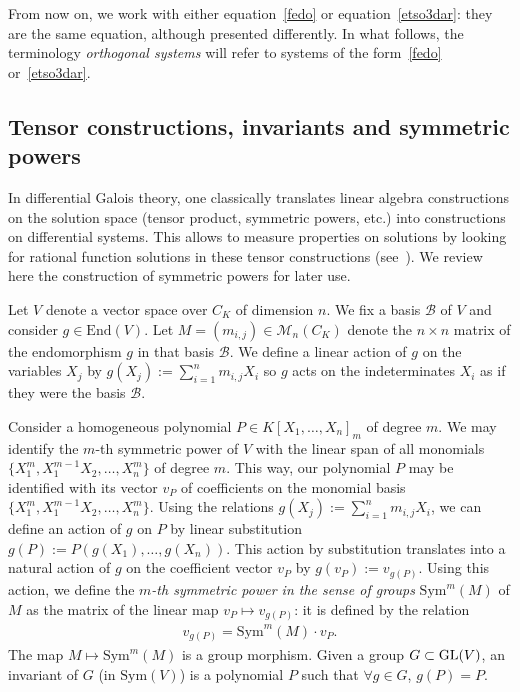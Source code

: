 \documentclass[10pt,a4paper]{amsart}
\numberwithin{equation}{section}
\def\Sym{\mathrm{Sym}}
\providecommand{\cal}{\mathcal}
\begin{document}
From now on, we work with either equation~\eqref{fedo} or equation~\eqref{etso3dar}: they are the same equation, although presented differently.
In what follows, the terminology \emph{orthogonal systems} will refer to systems of the form~\eqref{fedo} or~\eqref{etso3dar}.



\subsection{Tensor constructions, invariants and symmetric powers}\label{tensor-constructions}

In differential Galois theory, one classically translates linear algebra constructions on the solution space (tensor product, symmetric powers, etc.) into constructions on differential systems. This allows to measure properties on solutions by looking for rational function solutions in these tensor constructions (see~\cite[Chapters~3 and~4]{PS}). We review here the construction of symmetric powers for later use.

Let $V$ denote a vector space over $C_K$ of dimension $n$. We fix a basis $\cal{B}$ of $V$ and consider $g\in \mathrm{End}(V)$. Let
$M = (m_{i,j}) \in {\mathcal M}_{n}(C_K)$ denote the $n\times n$ matrix of the endomorphism $g$ in that basis $\cal{B}$.
We define a linear action of $g$
on the variables $X_{j}$ by $g(X_{j}):=\sum_{i=1}^n m_{i,j} X_{i}$ so $g$ acts on the indeterminates $X_i$ as if they were the basis $\cal{B}$.

Consider a homogeneous polynomial
$P\in K[X_{1},\ldots,X_{n}]_{m}$ of degree $m$.
We may identify the $m$-th symmetric power of $V$ with the linear span of all monomials
$\{X_{1}^{m}, X_{1}^{m-1}X_{2}, \ldots, X_{n}^{m}\}$ of degree $m$. This way, our polynomial $P$ may be identified with its vector $v_{P}$ of coefficients on the monomial basis $\{X_{1}^{m}, X_{1}^{m-1}X_{2}, \ldots,X_{n}^{m}\}$.
Using the relations $g(X_{j}):=\sum_{i=1}^n m_{i,j} X_{i}$, we can define an action of
$g$ on $P$ by linear substitution $g(P):=P(g(X_{1}),\ldots, g(X_{n}))$.
This action by substitution translates into a natural action of $g$ on the coefficient vector $v_{P}$
by $g(v_{P}):=v_{g(P)}$.
Using this action, we define the \emph{$m$-th symmetric power in the sense of groups} $\Sym^m(M)$ of $M$ as the matrix of the linear map $v_{P} \mapsto v_{g(P)}$: it is defined by the relation
\begin{gather*}
v_{g(P)}=\Sym^m(M) \cdot v_{P}.
\end{gather*}
The map $M \mapsto \Sym^m(M)$ is a group morphism.
Given a group $G\subset {\rm GL}(V)$, an invariant of $G$ (in $\Sym(V)$) is a polynomial $P$ such that $\forall g\in G$, $g(P)=P$.
\end{document}
